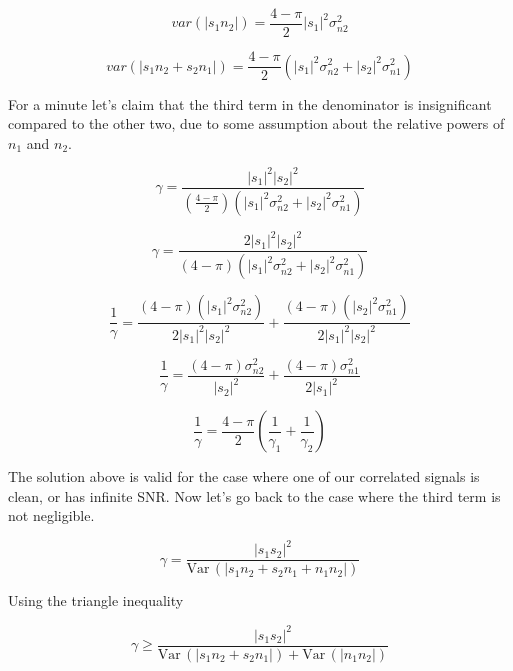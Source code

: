 \documentclass[11pt]{article}
\def\Var{{\textrm{Var}}\,}
\begin{document}
\begin{equation}
var(|s_1 n_2|) =
\frac{4-\pi}{2} |s_1|^2 \sigma_{n2}^2
\end{equation}


\begin{equation}
var(|s_1 n_2 + s_2 n_1|) =
\frac{4-\pi}{2}
\left(|s_1|^2 \sigma_{n2}^2 + |s_2|^2 \sigma_{n1}^2 \right)
\end{equation}

For a minute let's claim that the third term in the denominator is insignificant compared to the other two, due to some assumption about the relative powers of $n_1$ and $n_2$.

\begin{equation}
\gamma = \frac{|s_1|^2 |s_2|^2}{\left( \frac{4-\pi}{2}\right) \left( |s_1|^2 \sigma_{n2}^2 + |s_2|^2 \sigma_{n1}^2 \right)}
\end{equation}


\begin{equation}
\gamma = \frac{2|s_1|^2 |s_2|^2}{\left( 4-\pi \right) \left( |s_1|^2 \sigma_{n2}^2 + |s_2|^2 \sigma_{n1}^2 \right)}
\end{equation}


\begin{equation}
\frac{1}{\gamma}
=
\frac{(4-\pi)(|s_1|^2 \sigma_{n2}^2)}{2|s_1|^2 |s_2|^2}
+
\frac{(4-\pi)(|s_2|^2\sigma_{n1}^2)}{2|s_1|^2 |s_2|^2}
\end{equation}


\begin{equation}
\frac{1}{\gamma}
=
\frac{(4-\pi)\sigma_{n2}^2}{|s_2|^2}
+
\frac{(4-\pi)\sigma_{n1}^2}{2|s_1|^2}
\end{equation}

\begin{equation}
\boxed{
\frac{1}{\gamma}
=
\frac{4-\pi}{2}
\left(
\frac{1}{\gamma_1} + \frac{1}{\gamma_2}
\right)
}
\end{equation}

The solution above is valid for the case where one of our correlated signals is clean, or has infinite SNR. Now let's go back to the case where the third term is not negligible. 

\begin{equation}
\gamma = \frac{|s_1 s_2|^2}{\Var(|s_1 n_2 + s_2 n_1 + n_1 n_2|)}
\end{equation}

Using the triangle inequality

\begin{equation}
\gamma \geq \frac{|s_1 s_2|^2}{\Var(|s_1 n_2 + s_2 n_1|) + \Var(|n_1 n_2|)}
\end{equation}
\end{document}
